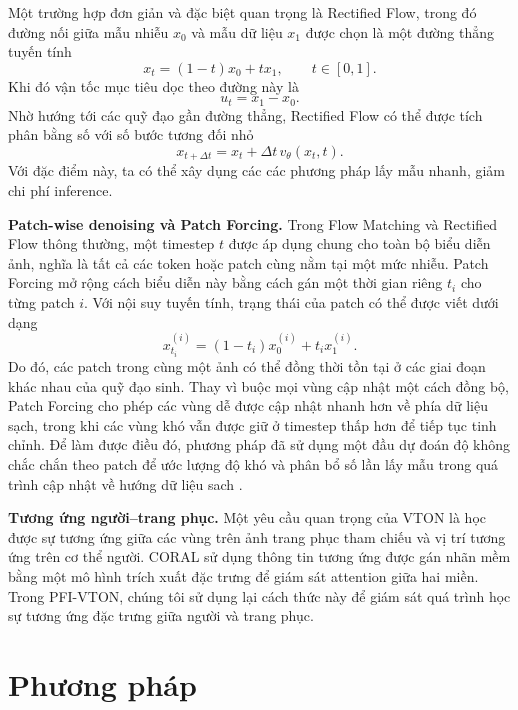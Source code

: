 \documentclass[11pt,a4paper]{article}
\begin{document}
Một trường hợp đơn giản và đặc biệt quan trọng là Rectified Flow, trong đó đường nối giữa mẫu nhiễu \(x_0\) và mẫu dữ liệu \(x_1\) được chọn là một đường thẳng tuyến tính
\begin{equation}
x_t=(1-t)x_0+t x_1, \qquad t\in[0,1].
\end{equation}
Khi đó vận tốc mục tiêu dọc theo đường này là
\begin{equation}
u_t=x_1-x_0.
\end{equation}
Nhờ hướng tới các quỹ đạo gần đường thẳng, Rectified Flow có thể được tích phân bằng số với số bước tương đối nhỏ
\begin{equation}
x_{t+\Delta t} = x_t+\Delta t\,v_\theta(x_t,t).
\end{equation}
Với đặc điểm này, ta có thể xây dụng các các phương pháp lấy mẫu nhanh, giảm chi phí inference.

\textbf{Patch-wise denoising và Patch Forcing.}
Trong Flow Matching và Rectified Flow thông thường, một timestep \(t\) được áp dụng chung cho toàn bộ biểu diễn ảnh, nghĩa là tất cả các token hoặc patch cùng nằm tại một mức nhiễu. Patch Forcing \cite{pf} mở rộng cách biểu diễn này bằng cách gán một thời gian riêng \(t_i\) cho từng patch \(i\). Với nội suy tuyến tính, trạng thái của patch có thể được viết dưới dạng
\begin{equation}
x_{t_i}^{(i)} = (1-t_i)x_0^{(i)} + t_i x_1^{(i)}.
\end{equation}
Do đó, các patch trong cùng một ảnh có thể đồng thời tồn tại ở các giai đoạn khác nhau của quỹ đạo sinh. Thay vì buộc mọi vùng cập nhật một cách đồng bộ, Patch Forcing cho phép các vùng dễ được cập nhật nhanh hơn về phía dữ liệu sạch, trong khi các vùng khó vẫn được giữ ở timestep thấp hơn để tiếp tục tinh chỉnh. Để làm được điều đó, phương pháp đã sử dụng một đầu dự đoán độ không chắc chắn theo patch để ước lượng độ khó và phân bổ số lần lấy mẫu trong quá trình cập nhật về hướng dữ liệu sach \cite{pf}. 

\textbf{Tương ứng người--trang phục.}
Một yêu cầu quan trọng của VTON là học được sự tương ứng giữa các vùng trên ảnh trang phục tham chiếu và vị trí tương ứng trên cơ thể người. CORAL \cite{coral} sử dụng thông tin tương ứng được gán nhãn mềm bằng một mô hình trích xuất đặc trưng để giám sát attention giữa hai miền. Trong PFI-VTON, chúng tôi sử dụng lại cách thức này để giám sát quá trình học sự tương ứng đặc trưng giữa người và trang phục.

\section{Phương pháp}
\end{document}
